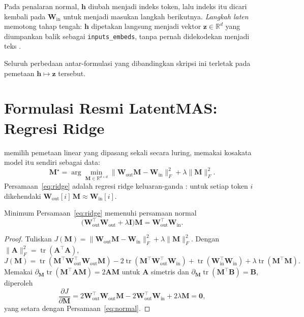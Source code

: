 \documentclass{laporanta1statugm}
\newcommand{\code}[1]{\texttt{#1}}
\begin{document}
Pada penalaran normal, $\bm{h}$ diubah menjadi indeks token, lalu indeks itu
dicari kembali pada $\bm{W}_{\text{in}}$ untuk menjadi masukan langkah
berikutnya. \emph{Langkah laten} memotong tahap tengah: $\bm{h}$ dipetakan
langsung menjadi vektor $\bm{z}\in\mathbb{R}^{d}$ yang diumpankan balik sebagai
\code{inputs\_embeds}, tanpa pernah didekodekan menjadi teks
\citep{coconut, latentmas}.

Seluruh perbedaan antar-formulasi yang dibandingkan skripsi ini terletak pada
pemetaan $\bm{h}\mapsto\bm{z}$ tersebut.

\section{Formulasi Resmi LatentMAS: Regresi Ridge}

\citet{latentmas} memilih pemetaan linear yang dipasang sekali secara luring,
memakai kosakata model itu sendiri sebagai data:
\begin{equation}
  \bm{M}^\star = \arg\min_{\bm{M}\in\mathbb{R}^{d\times d}}
  \bigl\lVert \bm{W}_{\text{out}}\bm{M} - \bm{W}_{\text{in}} \bigr\rVert_F^2
  + \lambda\lVert \bm{M}\rVert_F^2 .
  \label{eq:ridge}
\end{equation}
Persamaan~\eqref{eq:ridge} adalah regresi ridge keluaran-ganda
\citep{ridge, wooldridge}: untuk setiap token $i$ dikehendaki
$\bm{W}_{\text{out}}[i]\,\bm{M} \approx \bm{W}_{\text{in}}[i]$.

\begin{teorema}
\label{teo:ridge}
Minimum Persamaan~\eqref{eq:ridge} memenuhi persamaan normal
\begin{equation}
  \bigl(\bm{W}_{\text{out}}^{\top}\bm{W}_{\text{out}} + \lambda\bm{I}\bigr)\bm{M}
  = \bm{W}_{\text{out}}^{\top}\bm{W}_{\text{in}} .
  \label{eq:normal}
\end{equation}
\end{teorema}

\begin{proof}
Tuliskan $J(\bm{M}) = \lVert\bm{W}_{\text{out}}\bm{M}-\bm{W}_{\text{in}}\rVert_F^2
+ \lambda\lVert\bm{M}\rVert_F^2$. Dengan
$\lVert\bm{A}\rVert_F^2 = \operatorname{tr}(\bm{A}^\top\bm{A})$,
\[
  J(\bm{M}) = \operatorname{tr}(\bm{M}^\top\bm{W}_{\text{out}}^\top\bm{W}_{\text{out}}\bm{M})
  - 2\operatorname{tr}(\bm{M}^\top\bm{W}_{\text{out}}^\top\bm{W}_{\text{in}})
  + \operatorname{tr}(\bm{W}_{\text{in}}^\top\bm{W}_{\text{in}})
  + \lambda\operatorname{tr}(\bm{M}^\top\bm{M}).
\]
Memakai $\partial_{\bm{M}}\operatorname{tr}(\bm{M}^\top\bm{A}\bm{M}) = 2\bm{A}\bm{M}$
untuk $\bm{A}$ simetris dan
$\partial_{\bm{M}}\operatorname{tr}(\bm{M}^\top\bm{B}) = \bm{B}$, diperoleh
\[
  \frac{\partial J}{\partial\bm{M}}
  = 2\bm{W}_{\text{out}}^\top\bm{W}_{\text{out}}\bm{M}
  - 2\bm{W}_{\text{out}}^\top\bm{W}_{\text{in}} + 2\lambda\bm{M} = \bm{0},
\]
yang setara dengan Persamaan~\eqref{eq:normal}.
\end{proof}
\end{document}
